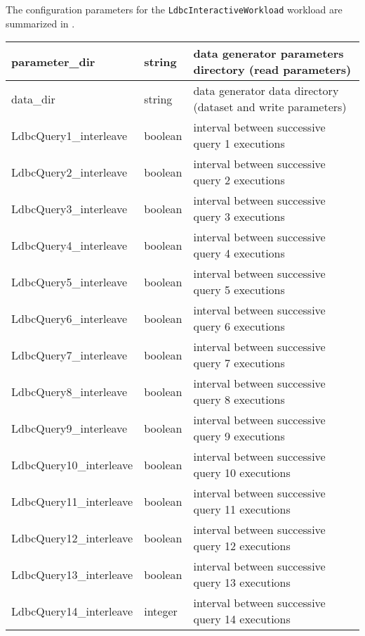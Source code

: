 The configuration parameters for the \texttt{LdbcInteractiveWorkload} workload are summarized in .

\begin{table}[h!]
	\label{tab:snb_interactive_driver_parameters}
	\begin{center}
		\begin{tabular}{|l|l|l|}
		\hline
		parameter\_dir &
		string &
		data generator parameters directory (read parameters) \\
		\hline
		data\_dir &
		string &
		data generator data directory (dataset and write parameters) \\
		\hline
		LdbcQuery1\_interleave &
		boolean &
		interval between successive query 1 executions\\
		\hline
		LdbcQuery2\_interleave &
		boolean &
		interval between successive query 2 executions\\
		\hline
		LdbcQuery3\_interleave &
		boolean &
		interval between successive query 3 executions\\
		\hline
		LdbcQuery4\_interleave &
		boolean &
		interval between successive query 4 executions\\
		\hline
		LdbcQuery5\_interleave &
		boolean &
		interval between successive query 5 executions\\
		\hline
		LdbcQuery6\_interleave &
		boolean &
		interval between successive query 6 executions\\
		\hline
		LdbcQuery7\_interleave &
		boolean &
		interval between successive query 7 executions\\
		\hline
		LdbcQuery8\_interleave &
		boolean &
		interval between successive query 8 executions\\
		\hline
		LdbcQuery9\_interleave &
		boolean &
		interval between successive query 9 executions\\
		\hline
		LdbcQuery10\_interleave &
		boolean &
		interval between successive query 10 executions\\
		\hline
		LdbcQuery11\_interleave &
		boolean &
		interval between successive query 11 executions\\
		\hline
		LdbcQuery12\_interleave &
		boolean &
		interval between successive query 12 executions\\
		\hline
		LdbcQuery13\_interleave &
		boolean &
		interval between successive query 13 executions\\
		\hline
		LdbcQuery14\_interleave &
		integer &
		interval between successive query 14 executions\\

\end{tabular}
\end{center}
\end{table}
